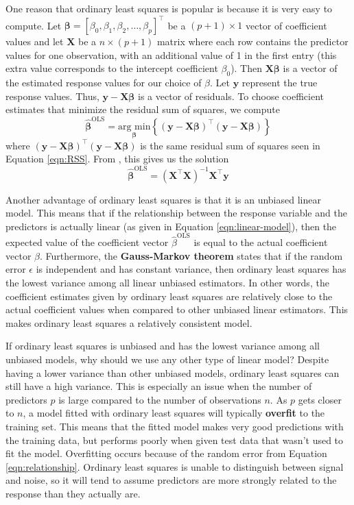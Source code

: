 \documentclass{article}
\newcommand{\argmin}[2]{\underset{#1}{\text{arg min}}\left\{#2\right\}}
\begin{document}
One reason that ordinary least squares is popular is because it is very easy to compute. Let $\bm{\beta} = [\beta_0, \beta_1, \beta_2, \dotsc, \beta_p]^\top$ be a $(p + 1) \times 1$ vector of coefficient values and let $\mathbf{X}$ be a $n\times (p + 1)$ matrix where each row contains the predictor values for one observation, with an additional value of 1 in the first entry (this extra value corresponds to the intercept coefficient $\beta_0$). Then $\mathbf{X}\bm{\beta}$ is a vector of the estimated response values for our choice of $\beta$. Let $\mathbf{y}$ represent the true response values. Thus, $\mathbf{y} - \mathbf{X}\bm{\beta}$ is a vector of residuals. To choose coefficient estimates that minimize the residual sum of squares, we compute
\begin{equation}
	\hat{\bm{\beta}}^{\text{OLS}} = \argmin{\bm{\beta}}{(\mathbf{y} - \mathbf{X}\bm{\beta})^\top (\mathbf{y} - \mathbf{X}\bm{\beta})}
\end{equation}
where $(\mathbf{y} - \mathbf{X}\bm{\beta})^\top (\mathbf{y} - \mathbf{X}\bm{\beta})$ is the same residual sum of squares seen in Equation \ref{eqn:RSS}. From \cite{friedman2001elements}, this gives us the solution
\begin{equation}\label{eqn:ols-solution}
	\hat{\bm{\beta}}^{\text{OLS}} = (\mathbf{X}^\top \mathbf{X})^{-1} \mathbf{X}^\top \mathbf{y}
\end{equation}

Another advantage of ordinary least squares is that it is an unbiased linear model. This means that if the relationship between the response variable and the predictors is actually linear (as given in Equation \ref{eqn:linear-model}), then the expected value of the coefficient vector $\hat{\beta}^\text{OLS}$ is equal to the actual coefficient vector $\beta$. Furthermore, the \textbf{Gauss-Markov theorem} states that if the random error $\epsilon$ is independent and has constant variance, then ordinary least squares has the lowest variance among all linear unbiased estimators. In other words, the coefficient estimates given by ordinary least squares are relatively close to the actual coefficient values when compared to other unbiased linear estimators. This makes ordinary least squares a relatively consistent model.

If ordinary least squares is unbiased and has the lowest variance among all unbiased models, why should we use any other type of linear model? Despite having a lower variance than other unbiased models, ordinary least squares can still have a high variance. This is especially an issue when the number of predictors $p$ is large compared to the number of observations $n$. As $p$ gets closer to $n$, a model fitted with ordinary least squares will typically \textbf{overfit} to the training set. This means that the fitted model makes very good predictions with the training data, but performs poorly when given test data that wasn't used to fit the model. Overfitting occurs because of the random error from Equation \ref{eqn:relationship}. Ordinary least squares is unable to distinguish between signal and noise, so it will tend to assume predictors are more strongly related to the response than they actually are.
\end{document}
